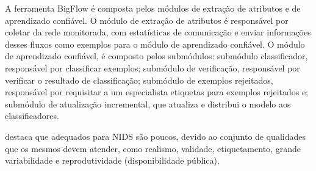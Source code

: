 A ferramenta BigFlow é composta pelos módulos de extração de atributos e de aprendizado confiável.
O módulo de extração de atributos
é responsável por coletar  da rede monitorada,
com estatísticas de comunicação e enviar informações desses fluxos como
exemplos para o módulo de aprendizado confiável.
O módulo de aprendizado confiável,
é composto pelos submódulos:
submódulo classificador, responsável por classificar exemplos;
submódulo de verificação, responsável por verificar o resultado de classificação;
submódulo de exemplos rejeitados, responsável por requisitar a um especialista
etiquetas para exemplos rejeitados e;
submódulo de atualização incremental, que atualiza e distribui o modelo aos classificadores.





 destaca que \datasets adequados para NIDS são
poucos, devido ao conjunto de qualidades que os mesmos devem atender, como
realismo, validade, etiquetamento, grande variabilidade e reprodutividade
(disponibilidade pública).

